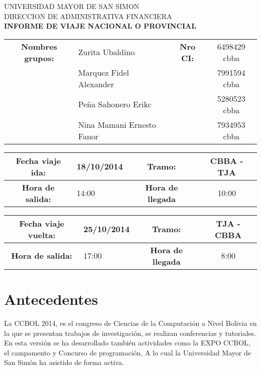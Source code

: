 \documentclass[letterpaper,12pt]{article}
\begin{document}
\begin{large}
	\begin{center}
		UNIVERSIDAD MAYOR DE SAN SIMON\\
		DIRECCION DE ADMINISTRATIVA FINANCIERA \\
		\textbf{INFORME DE VIAJE NACIONAL O PROVINCIAL}
	\end{center}
\end{large}
\vspace{.5cm}
\begin{center}
	\begin{tabular}{|c|l|c|c|}
	\hline
	 \textbf{Nombres grupos:} & Zurita Ubaldino & \textbf{Nro CI:} & 6498429 cbba\\
	  & Marquez Fidel Alexander & & 7991594 cbba \\
	  & Pe\~na Sahonero Erikc & & 5280523 cbba\\
	  & Nina Mamani Ernesto Fanor & & 7934953 cbba\\ \hline
	\end{tabular}
\end{center}
\vspace{.5cm}
\begin{center}
		\begin{tabular}{|c|l|c|c|}
		\hline
		 \textbf{Fecha viaje ida:} & 18/10/2014 & \textbf{Tramo:} & CBBA - TJA \\ \hline
		 \textbf{Hora de salida:} & 14:00 & \textbf{Hora de llegada} & 10:00 \\
		\hline
		\end{tabular}
\end{center}
\begin{center}	
	\begin{tabular}{|c|l|c|c|}
	\hline
	 \textbf{Fecha viaje vuelta:} & 25/10/2014 & \textbf{Tramo:} & TJA - CBBA \\ \hline
	 \textbf{Hora de salida:} & 17:00 & \textbf{Hora de llegada} & 8:00 \\
	\hline
	\end{tabular}		
\end{center}

	\section{Antecedentes}
	
	La CCBOL 2014, es el congreso de Ciencias de la Computaci\'on a Nivel Bolivia en la que se presentan trabajos de investigaci\'on, se realizan conferencias y tutoriales. En esta versi\'on se ha desarrollado tambi\'en  actividades como la EXPO CCBOL, el campamento y Concurso de programaci\'on, A lo cual la Universidad Mayor de San Sim\'on ha asistido de forma activa.
	
\end{document}
